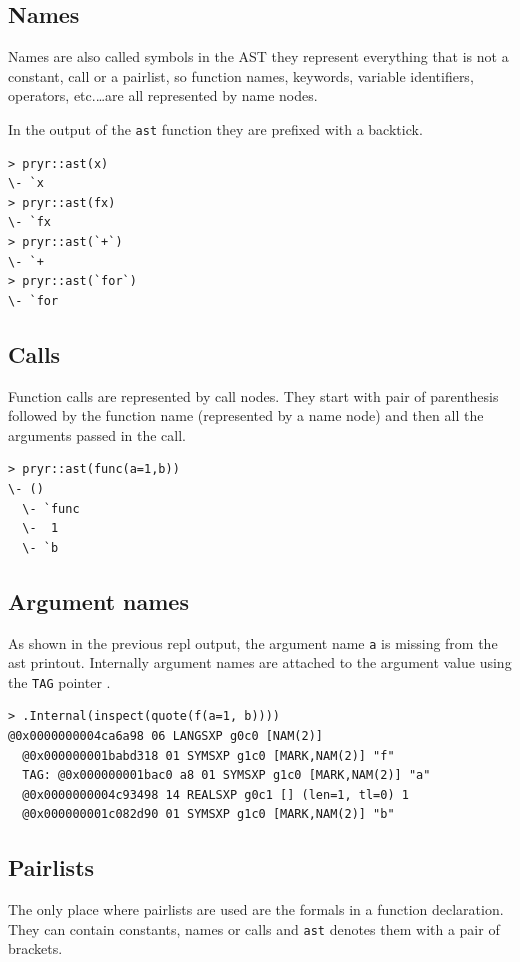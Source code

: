 \documentclass[thesis=B,english]{FITthesis}[2012/10/20]
\begin{document}
\subsection{Names}
Names are also called symbols in the AST they represent everything that is not a constant, call or a pairlist, so function names, keywords, variable identifiers, operators, etc.\ldots are all represented by name nodes.

In the output of the \verb|ast| function they are prefixed with a backtick.

\begin{verbatim}
> pryr::ast(x)
\- `x
> pryr::ast(fx)
\- `fx
> pryr::ast(`+`)
\- `+
> pryr::ast(`for`)
\- `for
\end{verbatim}

\subsection{Calls}
Function calls are represented by call nodes. They start with pair of parenthesis followed by the function name (represented by a name node) and then all the arguments passed in the call.

\begin{verbatim}
> pryr::ast(func(a=1,b))
\- ()
  \- `func
  \-  1
  \- `b
\end{verbatim}

\subsection{Argument names}
As shown in the previous repl output, the argument name \verb|a| is missing from the ast printout. Internally argument names are attached to the argument value using the \verb|TAG| pointer \cite{specs}.

\begin{verbatim}
> .Internal(inspect(quote(f(a=1, b))))
@0x0000000004ca6a98 06 LANGSXP g0c0 [NAM(2)]
  @0x000000001babd318 01 SYMSXP g1c0 [MARK,NAM(2)] "f"
  TAG: @0x000000001bac0 a8 01 SYMSXP g1c0 [MARK,NAM(2)] "a"
  @0x0000000004c93498 14 REALSXP g0c1 [] (len=1, tl=0) 1
  @0x000000001c082d90 01 SYMSXP g1c0 [MARK,NAM(2)] "b"
\end{verbatim}

\subsection{Pairlists}
The only place where pairlists are used are the formals in a function declaration. They can contain constants, names or calls and \verb|ast| denotes them with a pair of brackets.
\end{document}
